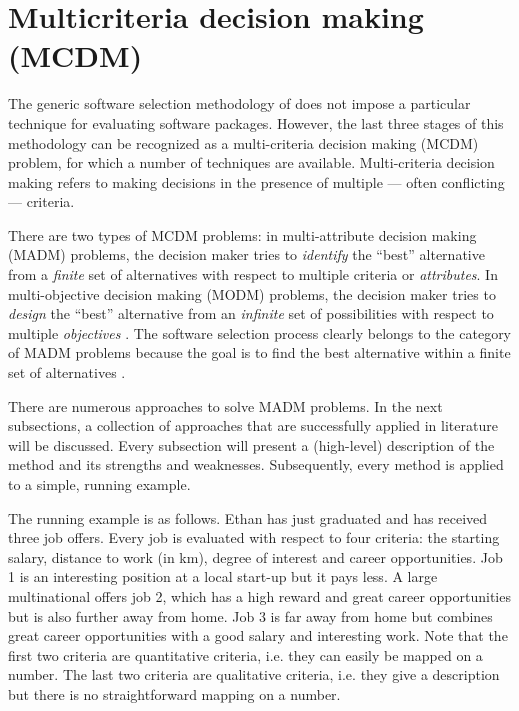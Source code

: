 \section{Multicriteria decision making (MCDM)}
\label{sec:mcdm}

The generic software selection methodology of \citet{Jadhav:2011} does not impose a particular technique for evaluating software packages. However, the last three stages of this methodology can be recognized as a multi-criteria decision making (MCDM) problem, for which a number of techniques are available. Multi-criteria decision making refers to making decisions in the presence of multiple --- often conflicting --- criteria. 

There are two types of MCDM problems: in multi-attribute decision making (MADM) problems, the decision maker tries to \emph{identify} the ``best'' alternative from a \emph{finite} set of alternatives with respect to multiple criteria or \emph{attributes}. In multi-objective decision making (MODM) problems, the decision maker tries to \emph{design} the ``best'' alternative from an \emph{infinite} set of possibilities with respect to multiple \emph{objectives} \cite{Kahraman:2008}. The software selection process clearly belongs to the category of MADM problems because the goal is to find the best alternative within a finite set of alternatives \cite{Jadhav:2009, Jadhav:2011}. 

There are numerous approaches to solve MADM problems. In the next subsections, a collection of approaches that are successfully applied in literature will be discussed. Every subsection will present a (high-level) description of the method and its strengths and weaknesses. Subsequently, every method is applied to a simple, running example.

The running example is as follows. Ethan has just graduated and has received three job offers. Every job is evaluated with respect to four criteria: the starting salary, distance to work (in km), degree of interest and career opportunities. Job 1 is an interesting position at a local start-up but it pays less. A large multinational offers job 2, which has a high reward and great career opportunities but is also further away from home. Job 3 is far away from home but combines great career opportunities with a good salary and interesting work. Note that the first two criteria are quantitative criteria, i.e. they can easily be mapped on a number. The last two criteria are qualitative criteria, i.e. they give a description but there is no straightforward mapping on a number. 

